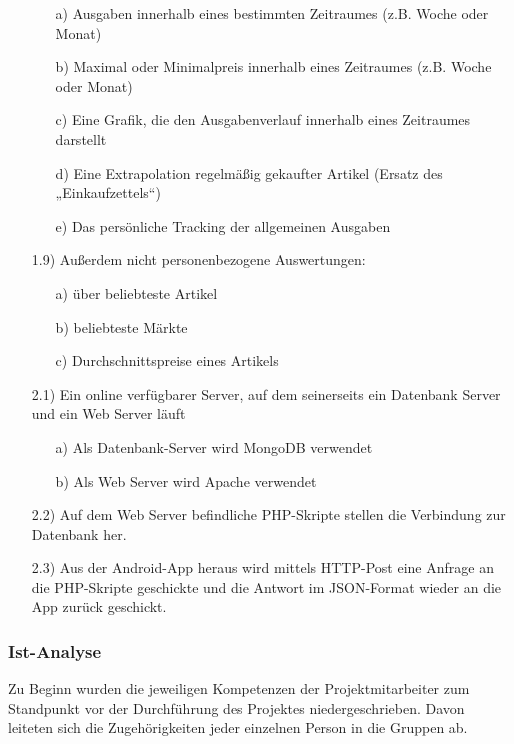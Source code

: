 \documentclass[12pt,a4paper]{article}
\begin{document}
\begin{itemize}
 \begin{itemize}
\item[a)]Ausgaben innerhalb eines bestimmten Zeitraumes (z.B. Woche oder Monat)
 \item[b)] Maximal oder Minimalpreis innerhalb eines Zeitraumes (z.B. Woche oder Monat) 
\item[c)] Eine Grafik, die den Ausgabenverlauf innerhalb eines Zeitraumes darstellt
\item[d)] Eine Extrapolation regelmäßig gekaufter Artikel (Ersatz des „Einkaufzettels“)
\item[e)]Das persönliche Tracking der allgemeinen Ausgaben
\end{itemize}
 \item[1.9)] Außerdem nicht personenbezogene Auswertungen:
 \begin{itemize}
\item[a)]über beliebteste Artikel
\item[b)] beliebteste Märkte
\item[c)] Durchschnittspreise eines Artikels
\end{itemize}
 \item[2.1)] Ein online verfügbarer Server, auf dem seinerseits ein Datenbank Server und ein Web Server läuft
 \begin{itemize}
\item[a)]Als Datenbank-Server wird MongoDB verwendet
\item[b)]Als Web Server wird Apache verwendet
\end{itemize}
\item[2.2)] Auf dem Web Server befindliche PHP-Skripte stellen die Verbindung zur Datenbank her.
\item[2.3)] Aus der Android-App heraus wird mittels HTTP-Post eine Anfrage an die PHP-Skripte geschickte und die Antwort im JSON-Format wieder an die App zurück geschickt.
\end{itemize}
\newpage

\subsubsection{Ist-Analyse}
Zu Beginn wurden die jeweiligen Kompetenzen der Projektmitarbeiter zum Standpunkt vor der Durchführung des Projektes niedergeschrieben. Davon leiteten sich die Zugehörigkeiten jeder einzelnen Person in die Gruppen ab.\\
\newline
\end{document}

